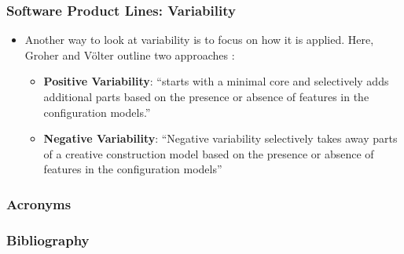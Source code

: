 \documentclass{beamer}
\begin{document}
\begin{frame}
\frametitle{Software Product Lines: Variability}

\begin{itemize}
\item Another way to look at variability is to focus on how it is
  applied. Here, Groher and V{\"o}lter outline two approaches
  \cite{groher2007expressing}:

  \pause

  \begin{itemize}

  \item \textbf{Positive Variability}: ``starts with a minimal core
    and selectively adds additional parts based on the presence or
    absence of features in the configuration models.''

  \pause

  \item \textbf{Negative Variability}: ``Negative variability
    selectively takes away parts of a creative construction model
    based on the presence or absence of features in the configuration
    models''

  \end{itemize}

\end{itemize}

\end{frame}

\begin{frame}
\frametitle{Acronyms}

\begin{acronym}
\end{acronym}

\end{frame}

\begin{frame}
\frametitle{Bibliography}

\printbibliography

\end{frame}
\end{document}
